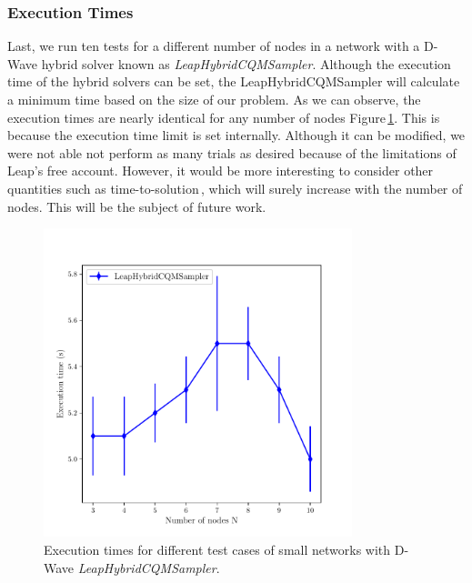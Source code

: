 \subsubsection{Execution Times}
Last, we run ten tests for a different number of nodes in a network with a D-Wave hybrid solver known as \textit{LeapHybridCQMSampler}. Although the execution time of the hybrid solvers can be set, the LeapHybridCQMSampler will calculate a minimum time based on the size of our problem. As we can observe, the execution times are nearly identical for any number of nodes Figure\,\ref{fig: ExecutionTimes}. This is because the execution time limit is set internally.  Although it can be modified, we were not able not perform as many trials as desired because of the limitations of Leap's free account. However, it would be more interesting to consider other quantities such as time-to-solution\,\cite{Mandr2018}, which will surely increase with the number of nodes. This will be the subject of future work.
\begin{figure}[H]
  \begin{center}
\includegraphics[width=0.8\textwidth]{Figures/ExecutionTimes.pdf}
  \end{center}
  \caption{Execution times for different test cases of small networks with D-Wave \textit{LeapHybridCQMSampler}.}
  \label{fig: ExecutionTimes}
\end{figure}
